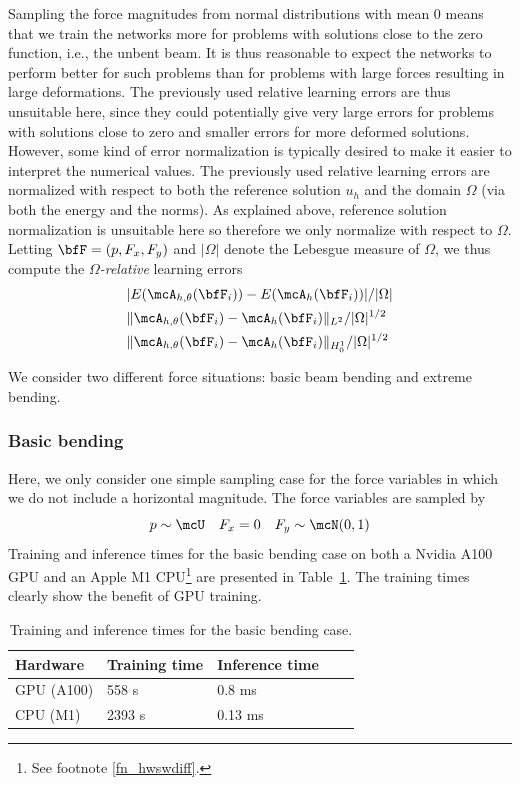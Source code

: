 \documentclass[12pt]{article}
\begin{document}
Sampling the force magnitudes from normal distributions with mean 0 means that we train the networks more for problems with solutions close to the zero function, i.e., the unbent beam. It is thus reasonable to expect the networks to perform better for such problems than for problems with large forces resulting in large deformations. The previously used relative learning errors are thus unsuitable here, since they could potentially give very large errors for problems with solutions close to zero and smaller errors for more deformed solutions. However, some kind of error normalization is typically desired to make it easier to interpret the numerical values. The previously used relative learning errors are normalized with respect to both the reference solution $u_h$ and the domain $\Omega$ (via both the energy and the norms). As explained above, reference solution normalization is unsuitable here so therefore we only normalize with respect to $\Omega$. Letting $\bfF = (p, F_x, F_y)$ and $|\Omega|$ denote the Lebesgue measure of $\Omega$, we thus compute the \emph{$\Omega$-relative} learning errors
\begin{align}
	&|E(\mcA_{h,\theta}(\bfF_i)) - E(\mcA_{h}(\bfF_i))|/|\Omega| \\
	&\|\mcA_{h,\theta}(\bfF_i) - \mcA_{h}(\bfF_i)\|_{L^2}/|\Omega|^{1/2} \\
	&\|\mcA_{h,\theta}(\bfF_i) - \mcA_{h}(\bfF_i)\|_{H_0^1}/|\Omega|^{1/2}
\end{align}

We consider two different force situations: basic beam bending and extreme bending.

\subsubsection{Basic bending}

Here, we only consider one simple sampling case for the force variables in which we do not include a horizontal magnitude. The force variables are sampled by
\begin{equation}
p \sim \mcU \quad F_x = 0 \quad F_y \sim \mcN(0, 1)
\end{equation}
Training and inference times for the basic bending case on both a Nvidia A100 GPU and an Apple M1 CPU\footnote{\label{fn_hwswdiff_2} See footnote \ref{fn_hwswdiff}.} are presented in Table~\ref{table_nonlinelast_traintimes_bb}. The training times clearly show the benefit of GPU training.

\begin{table}[h!]
	\caption{Training and inference times for the basic bending case.}
	\centering
	\begin{tabular}{|l|l|l|l|l|}
		\hline
		 Hardware & Training time & Inference time \\ \hline
		 GPU (A100) & 558 s & 0.8 ms \\ \hline
		 CPU (M1) & 2393 s & 0.13 ms \\ \hline
	\end{tabular}\label{table_nonlinelast_traintimes_bb}
\end{table}
\end{document}
